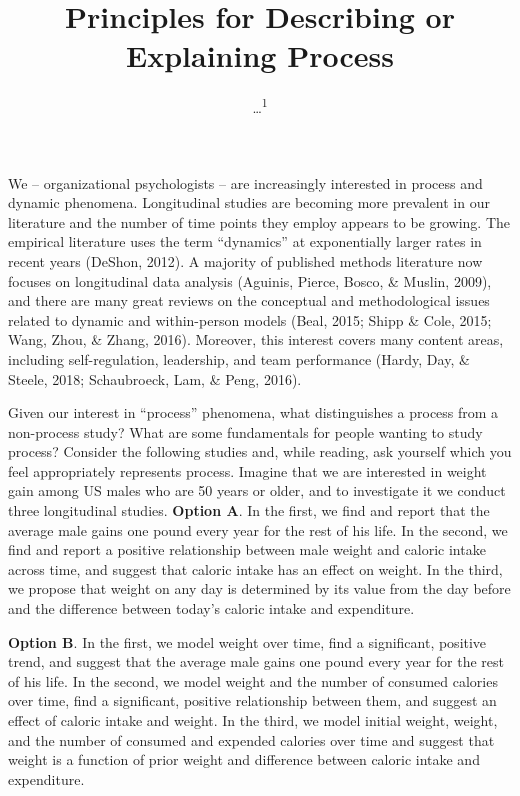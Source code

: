 \documentclass[english,,man]{apa6}
\title{Principles for Describing or Explaining Process}
\author{\ldots{}\textsuperscript{1}}
\date{}
\affiliation{
\vspace{0.5cm}
\textsuperscript{1} ...}
\theoremstyle{definition}
\theoremstyle{definition}
\theoremstyle{definition}
\theoremstyle{remark}
\begin{document}
\maketitle

We -- organizational psychologists -- are increasingly interested in
process and dynamic phenomena. Longitudinal studies are becoming more
prevalent in our literature and the number of time points they employ
appears to be growing. The empirical literature uses the term
\enquote{dynamics} at exponentially larger rates in recent years
(DeShon, 2012). A majority of published methods literature now focuses
on longitudinal data analysis (Aguinis, Pierce, Bosco, \& Muslin, 2009),
and there are many great reviews on the conceptual and methodological
issues related to dynamic and within-person models (Beal, 2015; Shipp \&
Cole, 2015; Wang, Zhou, \& Zhang, 2016). Moreover, this interest covers
many content areas, including self-regulation, leadership, and team
performance (Hardy, Day, \& Steele, 2018; Schaubroeck, Lam, \& Peng,
2016).

Given our interest in \enquote{process} phenomena, what distinguishes a
process from a non-process study? What are some fundamentals for people
wanting to study process? Consider the following studies and, while
reading, ask yourself which you feel appropriately represents process.
Imagine that we are interested in weight gain among US males who are 50
years or older, and to investigate it we conduct three longitudinal
studies. \textbf{Option A}. In the first, we find and report that the
average male gains one pound every year for the rest of his life. In the
second, we find and report a positive relationship between male weight
and caloric intake across time, and suggest that caloric intake has an
effect on weight. In the third, we propose that weight on any day is
determined by its value from the day before and the difference between
today's caloric intake and expenditure.

\textbf{Option B}. In the first, we model weight over time, find a
significant, positive trend, and suggest that the average male gains one
pound every year for the rest of his life. In the second, we model
weight and the number of consumed calories over time, find a
significant, positive relationship between them, and suggest an effect
of caloric intake and weight. In the third, we model initial weight,
weight, and the number of consumed and expended calories over time and
suggest that weight is a function of prior weight and difference between
caloric intake and expenditure.
\end{document}
